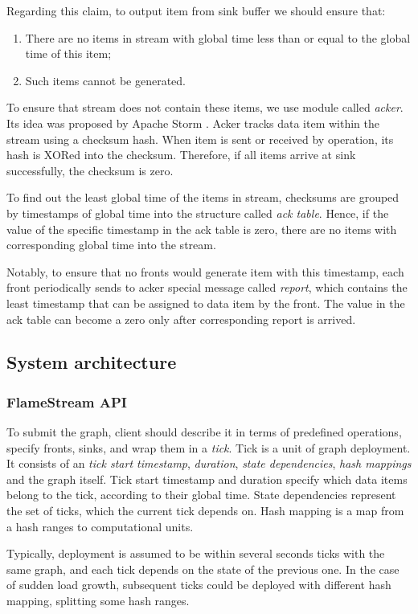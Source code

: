 Regarding this claim, to output item from sink buffer we should ensure that:
\begin{enumerate}
    \item There are no items in stream with global time less than or equal to the global time of this item;
    \item Such items cannot be generated.
\end{enumerate}

To ensure that stream does not contain these items, we use module called {\it acker}. Its idea was proposed by Apache Storm \cite{apache:storm}. Acker tracks data item within the stream using a checksum hash. When item is sent or received by operation, its hash is XORed into the checksum. Therefore, if all items arrive at sink successfully, the checksum is zero. 

To find out the least global time of the items in stream, checksums are grouped by timestamps of global time into the structure called {\it ack table}. Hence, if the value of the specific timestamp in the ack table is zero, there are no items with corresponding global time into the stream. 

Notably, to ensure that no fronts would generate item with this timestamp, each front periodically sends to acker special message called {\it report}, which contains the least timestamp that can be assigned to data item by the front. The value in the ack table can become a zero only after corresponding report is arrived.  

\subsection{System architecture}

\subsubsection{FlameStream API}
To submit the graph, client should describe it in terms of predefined operations, specify fronts, sinks, and wrap them in a {\it tick}. Tick is a unit of graph deployment. It consists of an {\it tick start timestamp}, {\it duration}, {\it state dependencies}, {\it hash mappings} and the graph itself. Tick start timestamp and duration specify which data items belong to the tick, according to their global time. State dependencies represent the set of ticks, which the current tick depends on. Hash mapping is a map from a hash ranges to computational units. 

Typically, deployment is assumed to be within several seconds ticks with the same graph, and each tick depends on the state of the previous one. In the case of sudden load growth, subsequent ticks could be deployed with different hash mapping, splitting some hash ranges.

